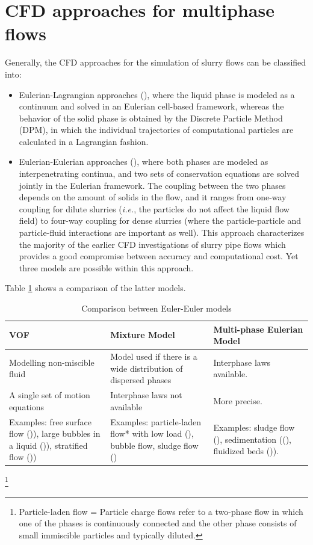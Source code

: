 \documentclass[11pt]{report}
\begin{document}
\section{CFD approaches for multiphase flows}
Generally, the CFD approaches for the simulation of slurry flows can be classified into:
\begin{itemize}
\item Eulerian-Lagrangian approaches (\cite{crowe-2011}), where the liquid phase is modeled as a continuum and solved in an Eulerian cell-based framework, whereas the behavior of the solid phase is obtained by the Discrete Particle Method (DPM), in which the individual trajectories of computational particles are calculated in a Lagrangian fashion.
%
\item Eulerian-Eulerian approaches (\cite{crowe-2011}), where  both phases are modeled as interpenetrating continua, and two sets of conservation equations are solved jointly in the Eulerian framework.
%
The coupling between the two phases depends on the amount of solids in the flow, and it ranges from one-way coupling for dilute slurries (\textit{i.e.}, the particles do not affect the liquid flow field) to four-way coupling for dense slurries (where the particle-particle and particle-fluid interactions are important as well).
%
This approach characterizes the majority of the earlier CFD investigations of slurry pipe flows which provides a good compromise between accuracy and computational cost.
%
Yet three models are possible within this approach.
\end{itemize}
%
Table \ref{tab:eul-eul-comp} shows a comparison of the latter models.
%
\begin{table}[ht!]
\caption{Comparison between Euler-Euler models}
\begin{tabular}{p{5.2cm}|p{5.2cm}|p{5.2cm}}
\hline 
VOF & 
Mixture Model & 
Multi-phase Eulerian Model 
\\\hline
Modelling non-miscible fluid &
Model used if there is a wide distribution of dispersed phases &
Interphase laws available. 
\\ \hline 
A single set of motion equations & 
Interphase laws not available & 
More precise. 
\\ \hline 
Examples: free surface flow (\cite{Jing-2016})), large bubbles in a liquid (\cite{Al-Yaari-2011})), stratified flow (\cite{Akhtar-2007})) & 
Examples: particle-laden flow* with low load (\cite{J-2007}), bubble flow, sludge flow (\cite{Liangyon-2009})  & 
Examples: sludge flow (\cite{Ofei-2016}), sedimentation ((\cite{gopaliya-2016}), fluidized beds (\cite{Ofei-2014})).\\
\hline
\end{tabular}
\label{tab:eul-eul-comp}
\end{table}
\footnote{Particle-laden flow = Particle charge flows refer to a two-phase flow in which one of the phases is continuously connected and the other phase consists of small immiscible particles and typically diluted.}
\end{document}
